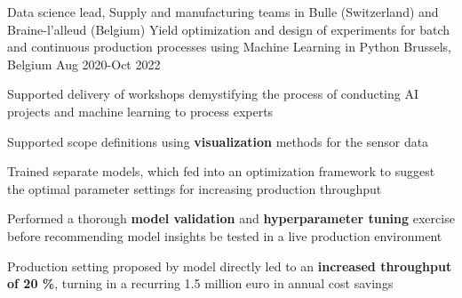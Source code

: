 
\vspace{2mm}

\begin{cventries}
  \cventry
    {Data science lead, Supply and manufacturing teams in Bulle (Switzerland) and Braine-l'alleud (Belgium)} %
    {Yield optimization and design of experiments for batch and continuous production processes using Machine Learning in Python} %
    {Brussels, Belgium} %
    {Aug 2020-Oct 2022} %
    {
    \begin{cvitems}
        \item Supported delivery of workshops demystifying the process of conducting AI projects and machine learning to process experts
        \item Supported scope definitions using \textbf{visualization} methods for the sensor data
    \end{cvitems}
    }
  \cventry
    {} %
    {} %
    {} %
    {} %
    {
    \begin{cvitems}
        \item Trained separate models, which fed into an optimization framework to suggest the optimal parameter settings for increasing production throughput
        \item Performed a thorough \textbf{model validation} and \textbf{hyperparameter tuning} exercise before recommending model insights be tested in a live production environment
        \item Production setting proposed by model directly led to an \textbf{increased throughput of 20 \%}, turning in a recurring 1.5 million euro in annual cost savings
    \end{cvitems}
    }



\end{cventries}
